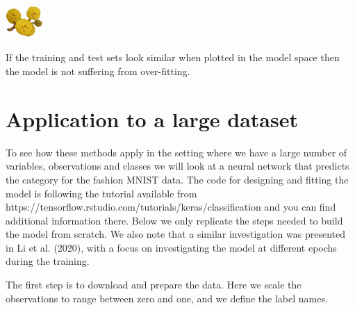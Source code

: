 \documentclass[
  letterpaper,
]{krantz}
\newcommand{\infobox}[1]{%
\noindent\colorbox{info!30}{%
\begin{minipage}{0.98\linewidth}%
    \centering%
    \begin{minipage}[c]{0.15\linewidth} %
      \includegraphics[width=1.5cm]{images/mulga-flowers2.png} %
    \end{minipage}%
    \hfill %
    \begin{minipage}[c]{0.8\linewidth} %
      \bigskip%
      \textsf{#1}%
      \bigskip%
    \end{minipage}%
    \hspace*{3mm}%
  \end{minipage}%
}%
}
\begin{document}
\infobox{If the training and test sets look similar when plotted in the model space then the model is not suffering from over-fitting. 
}

\section{Application to a large
dataset}\label{application-to-a-large-dataset}

To see how these methods apply in the setting where we have a large
number of variables, observations and classes we will look at a neural
network that predicts the category for the fashion MNIST data. The code
for designing and fitting the model is following the tutorial available
from https://tensorflow.rstudio.com/tutorials/keras/classification and
you can find additional information there. Below we only replicate the
steps needed to build the model from scratch. We also note that a
similar investigation was presented in Li et al. (2020), with a focus on
investigating the model at different epochs during the training.

The first step is to download and prepare the data. Here we scale the
observations to range between zero and one, and we define the label
names.
\end{document}

